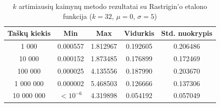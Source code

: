 \begin{table}[H]
    \centering
    \begin{tabular}{|c|c|c|c|c|}
        \hline
        \textbf{Taškų kiekis} & \textbf{Min} & \textbf{Max} & \textbf{Vidurkis} & \textbf{Std. nuokrypis} \\ \hline
        1 000        & 0.000557 & 1.812967 & 0.192605 & 0.206486 \\ \hline
        10 000       & 0.000152 & 1.873485 & 0.176899 & 0.172469 \\ \hline
        100 000      & 0.000025 & 4.135556 & 0.187990 & 0.203670 \\ \hline
        1 000 000    & 0.000002 & 5.468503 & 0.126666 & 0.137306 \\ \hline
        10 000 000   & $<10^{-6}$ & 4.319898 & 0.054192 & 0.057049 \\ \hline
    \end{tabular}
    \caption{$k$ artimiausių kaimynų metodo rezultatai su Rastrigin'o etalono funkcija ($k = 32$, $\mu = 0$, $\sigma = 5$)}
\end{table}
